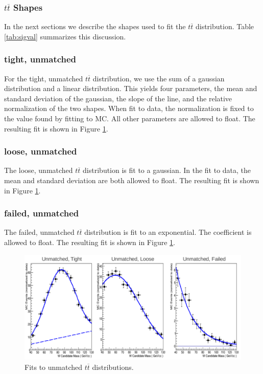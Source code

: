 \subsubsection{$t\overline{t}$ Shapes}
In the next sections we describe the shapes used to fit the $t\overline{t}$ distribution. Table \ref{tab:sigval} summarizes this discussion.
\subsubsection*{tight, unmatched}
For the tight, unmatched $t\overline{t}$ distribution, we use the sum of a gaussian distribution and a linear distribution. This yields four parameters, the mean and standard deviation of the gaussian, the slope of the line, and the relative normalization of the two shapes. When fit to data, the normalization is fixed to the value found by fitting to MC. All other parameters are allowed to float. The resulting fit is shown in Figure \ref{fig:unmatchedF}.
\subsubsection*{loose, unmatched}
The loose, unmatched $t\overline{t}$ distribution is fit to a gaussian. In the fit to data, the mean and standard deviation are both allowed to float. The resulting fit is shown in Figure \ref{fig:unmatchedF}.
\subsubsection*{failed, unmatched}
The failed, unmatched $t\overline{t}$ distribution is fit to an exponential. The coefficient is allowed to float. The resulting fit is shown in Figure \ref{fig:unmatchedF}.
\begin{figure}[ht!]
\centering
\includegraphics[scale=0.5]{figs/WtagSF/unmatched_fits.png}
\caption{Fits to unmatched $t\overline{t}$ distributions.}\label{fig:unmatchedF}
\end{figure}

